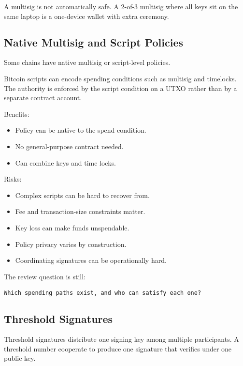 A multisig is not automatically safe. A 2-of-3 multisig where all keys
sit on the same laptop is a one-device wallet with extra ceremony.

\subsection{Native Multisig and Script Policies}

Some chains have native multisig or script-level policies.

Bitcoin scripts can encode spending conditions such as multisig and
timelocks. The authority is enforced by the script condition on a UTXO
rather than by a separate contract account.

Benefits:

\begin{itemize}
\tightlist
\item
  Policy can be native to the spend condition.
\item
  No general-purpose contract needed.
\item
  Can combine keys and time locks.
\end{itemize}

Risks:

\begin{itemize}
\tightlist
\item
  Complex scripts can be hard to recover from.
\item
  Fee and transaction-size constraints matter.
\item
  Key loss can make funds unspendable.
\item
  Policy privacy varies by construction.
\item
  Coordinating signatures can be operationally hard.
\end{itemize}

The review question is still:

\begin{lstlisting}
Which spending paths exist, and who can satisfy each one?
\end{lstlisting}

\subsection{Threshold Signatures}

Threshold signatures distribute one signing key among multiple
participants. A threshold number cooperate to produce one signature that
verifies under one public key.

